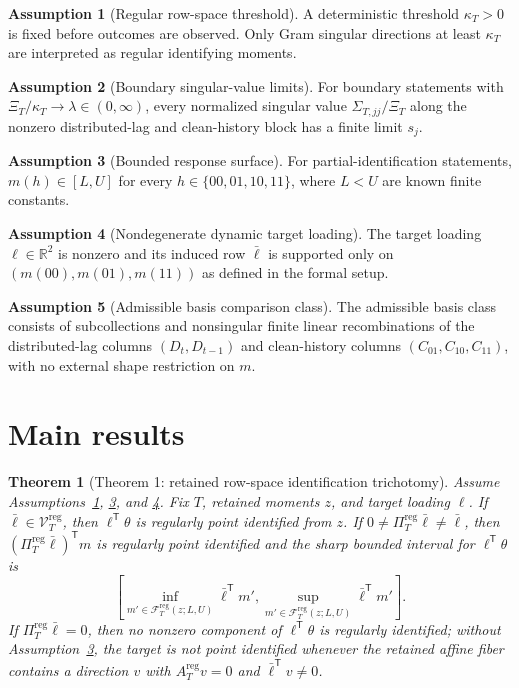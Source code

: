 \documentclass[11pt]{article}
\newcommand{\transpose}{\mathsf{T}}
\newcommand{\calF}{\mathcal{F}}
\newcommand{\R}{\mathbb{R}}
\theoremstyle{definition}
\newtheorem{assumption}{Assumption}
\theoremstyle{plain}
\newtheorem{theorem}{Theorem}
\theoremstyle{remark}
\begin{document}
\begin{assumption}[Regular row-space threshold]\label{ass:regular-threshold}
A deterministic threshold \(\kappa_T>0\) is fixed before outcomes are observed.
Only Gram singular directions at least \(\kappa_T\) are interpreted as regular identifying moments.
\end{assumption}

\begin{assumption}[Boundary singular-value limits]\label{ass:boundary-limits}
For boundary statements with \(\Xi_T/\kappa_T\to\lambda\in(0,\infty)\), every normalized singular value \(\Sigma_{T,jj}/\Xi_T\) along the nonzero distributed-lag and clean-history block has a finite limit \(s_j\).
\end{assumption}

\begin{assumption}[Bounded response surface]\label{ass:bounded-response}
For partial-identification statements, \(m(h)\in[L,U]\) for every \(h\in\{00,01,10,11\}\), where \(L<U\) are known finite constants.
\end{assumption}

\begin{assumption}[Nondegenerate dynamic target loading]\label{ass:nondegenerate-loading}
The target loading \(\ell\in\R^2\) is nonzero and its induced row \(\bar\ell\) is supported only on \((m(00),m(01),m(11))\) as defined in the formal setup.
\end{assumption}

\begin{assumption}[Admissible basis comparison class]\label{ass:basis-class}
The admissible basis class consists of subcollections and nonsingular finite linear recombinations of the distributed-lag columns \((D_t,D_{t-1})\) and clean-history columns \((C_{01},C_{10},C_{11})\), with no external shape restriction on \(m\).
\end{assumption}

\section{Main results}
\begin{theorem}[Theorem 1: retained row-space identification trichotomy]\label{thm:row-space-trichotomy}
Assume Assumptions~\ref{ass:regular-threshold}, \ref{ass:bounded-response}, and \ref{ass:nondegenerate-loading}.
Fix \(T\), retained moments \(z\), and target loading \(\ell\).
If \(\bar\ell\in\mathcal V_T^{\mathrm{reg}}\), then \(\ell^\transpose\theta\) is regularly point identified from \(z\).
If \(0\ne\Pi_T^{\mathrm{reg}}\bar\ell\ne\bar\ell\), then \((\Pi_T^{\mathrm{reg}}\bar\ell)^\transpose m\) is regularly point identified and the sharp bounded interval for \(\ell^\transpose\theta\) is
\[
\left[
\inf_{m'\in\calF_T^{\mathrm{reg}}(z;L,U)}\bar\ell^\transpose m',
\sup_{m'\in\calF_T^{\mathrm{reg}}(z;L,U)}\bar\ell^\transpose m'
\right].
\]
If \(\Pi_T^{\mathrm{reg}}\bar\ell=0\), then no nonzero component of \(\ell^\transpose\theta\) is regularly identified; without Assumption~\ref{ass:bounded-response}, the target is not point identified whenever the retained affine fiber contains a direction \(v\) with \(A_T^{\mathrm{reg}}v=0\) and \(\bar\ell^\transpose v\ne0\).
\end{theorem}
\end{document}
